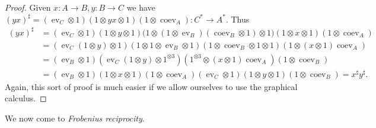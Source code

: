 \documentclass[a4paper,11pt]{article}
\theoremstyle{plain}
\theoremstyle{remark}
\newcommand{\ev}{\operatorname{ev}}
\newcommand{\coev}{\operatorname{coev}}
\begin{document}
\begin{proof}
Given $x \colon A\to B, y\colon B\to C$ we have $(yx)^\sharp = (\ev_C \otimes 1)(1\otimes yx\otimes 1)(1\otimes\coev_A) \colon C^* \to A^*$.  Thus
\begin{align*}
(yx)^\sharp
&= (\ev_C \otimes 1)(1\otimes y\otimes 1) \bigl(1\otimes (1\otimes\ev_B)(\coev_B\otimes 1)\otimes 1\bigr) (1\otimes x\otimes 1)(1\otimes\coev_A) \\
&= (\ev_C(1\otimes y)\otimes 1) (1\otimes 1\otimes\ev_B\otimes 1) (1\otimes\coev_B\otimes 1\otimes 1) (1\otimes (x\otimes 1)\coev_A) \\
&= (\ev_B\otimes 1)(\ev_C(1\otimes y)\otimes 1^{\otimes3})(1^{\otimes 3}\otimes (x\otimes 1)\coev_A) (1\otimes\coev_B) \\
&= (\ev_B\otimes 1)(1\otimes x\otimes 1)(1\otimes\coev_A) (\ev_C\otimes 1)(1\otimes y\otimes 1)(1\otimes\coev_B)
= x^\sharp y^\sharp.
\end{align*}
Again, this sort of proof is much easier if we allow ourselves to use the graphical calculus.
\end{proof}

We now come to \emph{Frobenius reciprocity}.
\end{document}
